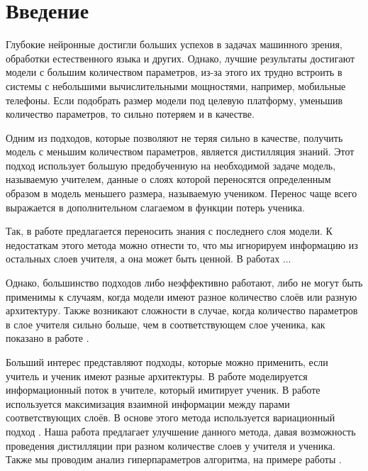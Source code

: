 \section{Введение}

Глубокие нейронные достигли больших успехов в задачах машинного зрения, обработки естественного языка и других.
Однако, лучшие результаты достигают модели с большим количеством параметров,
из-за этого их трудно встроить в системы с небольшими вычислительными мощностями, например, мобильные телефоны.
Если подобрать размер модели под целевую платформу, уменьшив количество параметров, то сильно потеряем и в качестве.

Одним из подходов, которые позволяют не теряя сильно в качестве, получить модель с меньшим количеством параметров, является дистилляция знаний.
Этот подход использует большую предобученную на необходимой задаче модель, называемую учителем,
данные о слоях которой переносятся определенным образом в модель меньшего размера, называемую учеником.
Перенос чаще всего выражается в дополнительном слагаемом в функции потерь ученика.

Так, в работе \cite{hinton2015distilling} предлагается переносить знания с последнего слоя модели.
К недостаткам этого метода можно отнести то, что мы игнорируем информацию из остальных слоев учителя, а она может быть ценной.
В работах ...

Однако, большинство подходов либо неэффективно работают, либо не могут быть применимы к случаям, когда модели имеют разное количество слоёв или разную архитектуру.
Также возникают сложности в случае, когда количество параметров в слое учителя сильно больше,
чем в соответствующем слое ученика, как показано в работе \cite{mirzadeh2020improved}.

Больший интерес представляют подходы, которые можно применить, если учитель и ученик имеют разные архитектуры.
В работе \cite{passalis2020heterogeneous} моделируется информационный поток в учителе, который имитирует ученик.
В работе \cite{Ahn_2019_CVPR} используется максимизация взаимной информации между парами соответствующих слоёв.
В основе этого метода используется вариационный подход \cite{barber2004algorithm}.
Наша работа предлагает улучшение данного метода, давая возможность проведения дистилляции при разном количестве слоев у учителя и ученика.
Также мы проводим анализ гиперпараметров алгоритма, на примере работы \cite{gorpinich2022gradient}.
